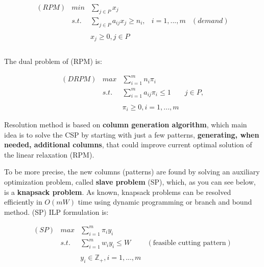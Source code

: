 \documentclass[10pt,a4paper]{article}
\begin{document}
\begin{equation}\label{eqn:RPM}
\begin{array} {lllrr} 

(RPM) & min & \displaystyle\sum_{j \in P} x_j && \\
& s.t. & \displaystyle\sum_{j \in P} a_{ij} x_j \geq n_i, & i = 1,...,m & (demand) \\\\
& & x_j \geq 0, j \in P  && \\\\
\end{array}
\end{equation}

The dual problem of (RPM) is:

\begin{equation}\label{eqn:DLPM}
\begin{array} {lllr} 
(DRPM) & max & \displaystyle\sum_{i = 1}^{m} n_i\pi_i & \\
& s.t. & \displaystyle\sum_{i = 1}^{m} a_{ij}\pi_i \leq 1 & j \in P, \\\\
&& \pi_i \geq 0, i = 1,...,m &
\end{array}
\end{equation}

Resolution method is based on \textbf{column generation algorithm}, which main idea is to solve the CSP by starting with just a few patterns, \textbf{generating, when needed, additional columns}, that could improve current optimal solution of the linear relaxation (RPM). 

To be more precise, the new columns (patterns) are found by solving an auxiliary optimization problem, called \textbf{slave problem} (SP), which, as you can see below, is a \textbf{knapsack problem}. As known, knapsack problems can be resolved efficiently in $O(mW)$ time using dynamic programming or branch and bound method. (SP) ILP formulation is:

\begin{equation}\label{eqn:SP}
\begin{array} {lllr} 
(SP) & max & \displaystyle\sum_{i = 1}^{m} \pi_i y_i & \\
& s.t. & \displaystyle\sum_{i = 1}^{m} w_i y_i \leq W & (\text{feasible cutting pattern}) \\\\
& & y_i \in \mathbb{Z}_{+}, i = 1,...,m  & \\\\
\end{array}
\end{equation}
\end{document}

